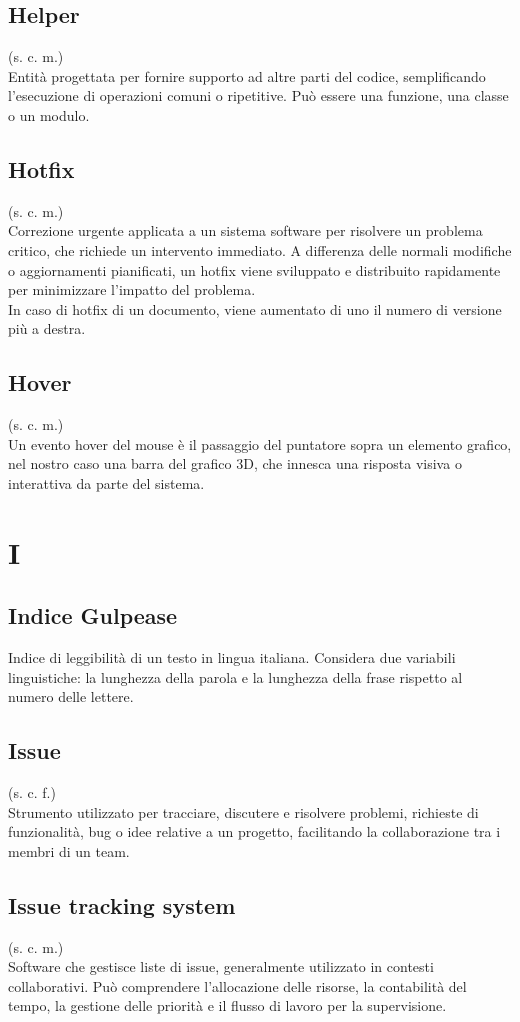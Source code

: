     \subsection{Helper}
    (s. c. m.)\\
    Entità progettata per fornire supporto ad altre parti del codice, 
    semplificando l'esecuzione di operazioni comuni o ripetitive.
    Può essere una funzione, una classe o un modulo.
    \subsection{Hotfix}
    (s. c. m.)\\
    Correzione urgente applicata a un sistema software per risolvere un problema critico, 
    che richiede un intervento immediato. A differenza delle normali modifiche o aggiornamenti pianificati, 
    un hotfix viene sviluppato e distribuito rapidamente per minimizzare l'impatto del problema.\\
    In caso di hotfix di un documento, viene aumentato di uno il numero di versione più a destra.
    \subsection{Hover}
    (s. c. m.)\\
    Un evento hover del mouse è il passaggio del puntatore sopra un elemento grafico, nel nostro caso una barra del grafico 3D, che innesca una risposta visiva o interattiva da parte del sistema.
\pagebreak
\section{I}
    \subsection{Indice Gulpease}
    Indice di leggibilità di un testo in lingua italiana. Considera due variabili 
    linguistiche: la lunghezza della parola e la lunghezza della frase rispetto 
    al numero delle lettere.
    \subsection{Issue}
    \label{Issue}
    (s. c. f.)\\
    Strumento utilizzato per tracciare, discutere e risolvere problemi, richieste di funzionalità, 
    bug o idee relative a un progetto, facilitando la collaborazione tra i membri di un team.
    \subsection{Issue tracking system}
    (s. c. m.)\\
    Software che gestisce liste di issue, generalmente utilizzato in contesti collaborativi.
    Può comprendere l'allocazione delle risorse, la contabilità del tempo, la gestione delle 
    priorità e il flusso di lavoro per la supervisione.
\pagebreak
